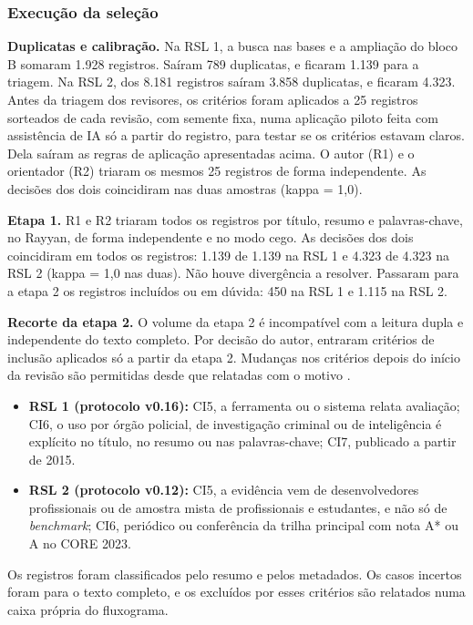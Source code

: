 \subsubsection{Execução da seleção}

\textbf{Duplicatas e calibração.} Na RSL 1, a busca nas bases e a ampliação
do bloco B somaram 1.928 registros. Saíram 789 duplicatas, e ficaram 1.139
para a triagem. Na RSL 2, dos 8.181 registros saíram 3.858 duplicatas, e
ficaram 4.323. Antes da triagem dos revisores, os critérios foram aplicados a
25 registros sorteados de cada revisão, com semente fixa, numa aplicação
piloto feita com assistência de IA só a partir do registro, para testar se os
critérios estavam claros. Dela saíram as regras de aplicação apresentadas
acima. O autor (R1) e o orientador (R2) triaram os mesmos 25 registros de
forma independente. As decisões dos dois coincidiram nas duas amostras
(kappa = 1,0).

\textbf{Etapa 1.} R1 e R2 triaram todos os registros por título, resumo e
palavras-chave, no Rayyan, de forma independente e no modo cego. As decisões
dos dois coincidiram em todos os registros: 1.139 de 1.139 na RSL 1 e 4.323
de 4.323 na RSL 2 (kappa = 1,0 nas duas). Não houve divergência a resolver.
Passaram para a etapa 2 os registros incluídos ou em dúvida: 450 na RSL 1 e
1.115 na RSL 2.

\textbf{Recorte da etapa 2.} O volume da etapa 2 é incompatível com a
leitura dupla e independente do texto completo. Por decisão do autor, entraram
critérios de inclusão aplicados só a partir da etapa 2. Mudanças nos
critérios depois do início da revisão são permitidas desde que relatadas com
o motivo \cite[item 24c]{page2021prisma}.
\begin{itemize}
	\item \textbf{RSL 1 (protocolo v0.16):} CI5, a ferramenta ou o sistema
	relata avaliação; CI6, o uso por órgão policial, de investigação criminal
	ou de inteligência é explícito no título, no resumo ou nas palavras-chave;
	CI7, publicado a partir de 2015.
	\item \textbf{RSL 2 (protocolo v0.12):} CI5, a evidência vem de
	desenvolvedores profissionais ou de amostra mista de profissionais e
	estudantes, e não só de \textit{benchmark}; CI6, periódico ou conferência
	da trilha principal com nota A* ou A no CORE 2023.
\end{itemize}
Os registros foram classificados pelo resumo e pelos metadados. Os casos
incertos foram para o texto completo, e os excluídos por esses critérios são
relatados numa caixa própria do fluxograma.

